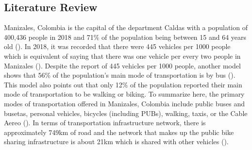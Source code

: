 \documentclass[12pt]{article}
\begin{document}
\subsection*{Literature Review}
Manizales, Colombia is the capital of the department Caldas with a population of 400,436 people in 2018 and 71\% of the population being between 15 and 64 years old (\cite{CalidaddeVida}). In 2018, it was recorded that there were 445 vehicles per 1000 people which is equivalent of saying that there was one vehicle per every two people in Manizales (\cite{CalidaddeVida}). Despite the report of 445 vehicles per 1000 people, another model shows that 56\% of the population's main mode of transportation is by bus (\cite{CalidaddeVida}). This model also points out that only 12\% of the population reported their main mode of transportation to be walking or biking. To summarize here, the primary modes of transportation offered in Manizales, Colombia include public buses and busetas, personal vehicles, bicycles (including PUBs), walking, taxis, or the Cable Aereo (\cite{CalidaddeVida}). In terms of transportation infrastructure network, there is approximately 749km of road and the network that makes up the public bike sharing infrastructure is about 21km which is shared with other vehicles (\cite{montoya2017acceso}).
\end{document}
